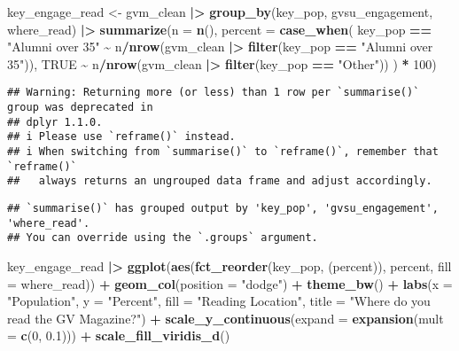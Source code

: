 \documentclass[
]{article}
\newenvironment{Shaded}{\begin{snugshade}}{\end{snugshade}}
\newcommand{\AttributeTok}[1]{\textcolor[rgb]{0.13,0.29,0.53}{#1}}
\newcommand{\ConstantTok}[1]{\textcolor[rgb]{0.56,0.35,0.01}{#1}}
\newcommand{\DecValTok}[1]{\textcolor[rgb]{0.00,0.00,0.81}{#1}}
\newcommand{\FloatTok}[1]{\textcolor[rgb]{0.00,0.00,0.81}{#1}}
\newcommand{\FunctionTok}[1]{\textcolor[rgb]{0.13,0.29,0.53}{\textbf{#1}}}
\newcommand{\NormalTok}[1]{#1}
\newcommand{\OtherTok}[1]{\textcolor[rgb]{0.56,0.35,0.01}{#1}}
\newcommand{\SpecialCharTok}[1]{\textcolor[rgb]{0.81,0.36,0.00}{\textbf{#1}}}
\newcommand{\StringTok}[1]{\textcolor[rgb]{0.31,0.60,0.02}{#1}}
\begin{document}
\begin{Shaded}
\begin{Highlighting}[]
\NormalTok{key\_engage\_read }\OtherTok{\textless{}{-}}\NormalTok{ gvm\_clean }\SpecialCharTok{|\textgreater{}}
  \FunctionTok{group\_by}\NormalTok{(key\_pop, gvsu\_engagement, where\_read) }\SpecialCharTok{|\textgreater{}}
  \FunctionTok{summarize}\NormalTok{(}\AttributeTok{n =} \FunctionTok{n}\NormalTok{(),}
            \AttributeTok{percent =} \FunctionTok{case\_when}\NormalTok{(}
\NormalTok{              key\_pop }\SpecialCharTok{==} \StringTok{"Alumni over 35"} \SpecialCharTok{\textasciitilde{}}\NormalTok{ n}\SpecialCharTok{/}\FunctionTok{nrow}\NormalTok{(gvm\_clean }\SpecialCharTok{|\textgreater{}} \FunctionTok{filter}\NormalTok{(key\_pop }\SpecialCharTok{==} \StringTok{"Alumni over 35"}\NormalTok{)),}
              \ConstantTok{TRUE} \SpecialCharTok{\textasciitilde{}}\NormalTok{ n}\SpecialCharTok{/}\FunctionTok{nrow}\NormalTok{(gvm\_clean }\SpecialCharTok{|\textgreater{}} \FunctionTok{filter}\NormalTok{(key\_pop }\SpecialCharTok{==} \StringTok{"Other"}\NormalTok{))}
\NormalTok{            ) }\SpecialCharTok{*} \DecValTok{100}\NormalTok{)}
\end{Highlighting}
\end{Shaded}

\begin{verbatim}
## Warning: Returning more (or less) than 1 row per `summarise()` group was deprecated in
## dplyr 1.1.0.
## i Please use `reframe()` instead.
## i When switching from `summarise()` to `reframe()`, remember that `reframe()`
##   always returns an ungrouped data frame and adjust accordingly.
\end{verbatim}

\begin{verbatim}
## `summarise()` has grouped output by 'key_pop', 'gvsu_engagement', 'where_read'.
## You can override using the `.groups` argument.
\end{verbatim}

\begin{Shaded}
\begin{Highlighting}[]
\NormalTok{key\_engage\_read }\SpecialCharTok{|\textgreater{}}
  \FunctionTok{ggplot}\NormalTok{(}\FunctionTok{aes}\NormalTok{(}\FunctionTok{fct\_reorder}\NormalTok{(key\_pop, (percent)), percent, }\AttributeTok{fill =}\NormalTok{ where\_read)) }\SpecialCharTok{+}
  \FunctionTok{geom\_col}\NormalTok{(}\AttributeTok{position =} \StringTok{"dodge"}\NormalTok{) }\SpecialCharTok{+}
  \FunctionTok{theme\_bw}\NormalTok{() }\SpecialCharTok{+}
  \FunctionTok{labs}\NormalTok{(}\AttributeTok{x =} \StringTok{"Population"}\NormalTok{, }\AttributeTok{y =} \StringTok{"Percent"}\NormalTok{, }\AttributeTok{fill =} \StringTok{"Reading Location"}\NormalTok{, }\AttributeTok{title =} \StringTok{"Where do you read the GV Magazine?"}\NormalTok{) }\SpecialCharTok{+}
  \FunctionTok{scale\_y\_continuous}\NormalTok{(}\AttributeTok{expand =} \FunctionTok{expansion}\NormalTok{(}\AttributeTok{mult =} \FunctionTok{c}\NormalTok{(}\DecValTok{0}\NormalTok{, }\FloatTok{0.1}\NormalTok{))) }\SpecialCharTok{+}
  \FunctionTok{scale\_fill\_viridis\_d}\NormalTok{()}
\end{Highlighting}
\end{Shaded}
\end{document}
